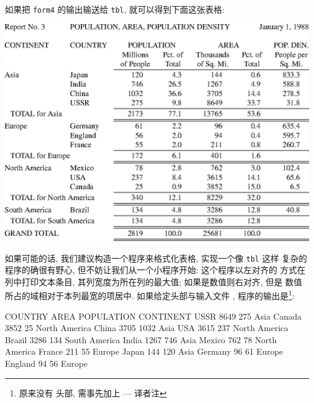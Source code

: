 如果把 \verb'form4' 的输出输送给 \verb'tbl', 就可以得到下面这张表格:
\begin{center}
    \includegraphics{./images/report3.eps}
\end{center}

如果可能的话, 我们建议构造一个程序来格式化表格, 实现一个像 \verb'tbl' 这样 
复杂的程序的确很有野心, 但不妨让我们从一个小程序开始: 这个程序以左对齐的
方式在列中打印文本条目, 其列宽度为所在列的最大值; 如果是数值则右对齐, 但是 
数值所占的域相对于本列最宽的项居中. 如果给定头部与输入文件
, 程序的输出是\footnote{ 原来没有
头部, 需事先加上 --- 译者注}:
\begin{awkcode}
    COUNTRY   AREA   POPULATION   CONTINENT    
    USSR      8649       275      Asia         
    Canada    3852        25      North America
    China     3705      1032      Asia         
    USA       3615       237      North America
    Brazil    3286       134      South America
    India     1267       746      Asia         
    Mexico     762        78      North America
    France     211        55      Europe       
    Japan      144       120      Asia         
    Germany     96        61      Europe       
    England     94        56      Europe       
\end{awkcode}

